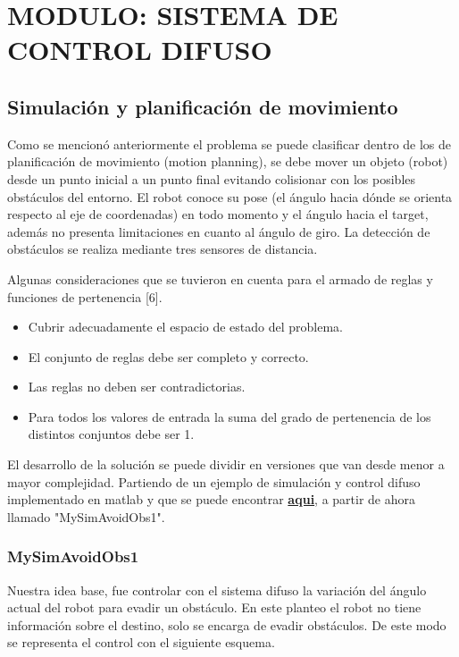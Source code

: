 \section{MODULO: SISTEMA DE CONTROL DIFUSO}

\subsection{Simulación y planificación de movimiento}

Como se mencionó anteriormente el problema se puede clasificar dentro de los de planificación de movimiento (motion planning), se debe mover un objeto (robot) desde un punto inicial a un punto final evitando colisionar con los posibles obstáculos del entorno. El robot conoce su pose (el ángulo hacia dónde se orienta respecto al eje de coordenadas) en todo momento y el ángulo hacia el target, además no presenta limitaciones en cuanto al ángulo de giro. La detección de obstáculos se realiza mediante tres sensores de distancia.

Algunas consideraciones que se tuvieron en cuenta para el armado de reglas y funciones de pertenencia [6].

\begin{itemize}
    \item Cubrir adecuadamente el espacio de estado del problema.
    \item El conjunto de reglas debe ser completo y correcto.
    \item Las reglas no deben ser contradictorias.
    \item Para todos los valores de entrada la suma del grado de pertenencia de los distintos conjuntos debe ser 1.
\end{itemize}

El desarrollo de la solución se puede dividir en versiones que van desde menor a mayor complejidad. Partiendo de un ejemplo de simulación y control difuso implementado en matlab y que se puede encontrar \href{https://www.mathworks.com/help/fuzzy/tune-fuzzy-systems-using-custom-cost-function.html}{\textbf{aqui}}, a partir de ahora llamado "MySimAvoidObs1".

\subsubsection{MySimAvoidObs1}

Nuestra idea base, fue controlar con el sistema difuso la variación del ángulo actual del robot para evadir un obstáculo. En este planteo el robot no tiene información sobre el destino, solo se encarga de evadir obstáculos. De este modo se representa el control con el siguiente esquema.

